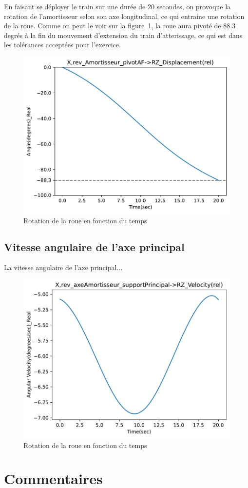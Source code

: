 \documentclass{article}
\begin{document}
En faisant se déployer le train sur une durée de 20 secondes, on provoque la rotation de l'amortisseur selon son axe longitudinal, ce qui entraine une rotation de la roue.
Comme on peut le voir sur la figure~\ref{fig:wheel_rotation}, la roue aura pivoté de 88.3 degrés à la fin du mouvement d'extension du train d'atterissage, ce qui est dans les tolérances acceptées pour l'exercice.

\begin{figure}[h]
    \includegraphics{data/displacement_angle_amortisseur.pdf}
    \caption{Rotation de la roue en fonction du temps}
    \label{fig:wheel_rotation}
\end{figure}
\subsection{Vitesse angulaire de l'axe principal}

La vitesse angulaire de l'axe principal...

\begin{figure}[h]
    \includegraphics{data/velocity_axeAmortisseur.pdf}
    \caption{Rotation de la roue en fonction du temps}
    \label{fig:speed_main_axis}
\end{figure}

\section{Commentaires}
\end{document}
